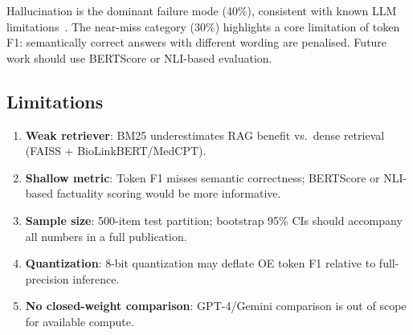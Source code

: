 \documentclass[sigconf, nonacm]{acmart}
\begin{document}
\begin{table}[h]
\caption{Failure case analysis --- 20 lowest OE token-F1 outputs (No RAG, per model)}
\label{tab:failure}
\footnotesize
{}
\end{table}

Hallucination is the dominant failure mode (40\%), consistent with known LLM
limitations~\cite{Ji2023}. The near-miss category (30\%) highlights a core
limitation of token F1: semantically correct answers with different wording
are penalised. Future work should use BERTScore or NLI-based evaluation.

\subsection{Limitations}
\label{sec:limitations}
\begin{enumerate}
  \item \textbf{Weak retriever}: BM25 underestimates RAG benefit vs.\ dense
        retrieval (FAISS + BioLinkBERT/MedCPT).
  \item \textbf{Shallow metric}: Token F1 misses semantic correctness; BERTScore
        or NLI-based factuality scoring would be more informative.
  \item \textbf{Sample size}: 500-item test partition; bootstrap 95\% CIs should
        accompany all numbers in a full publication.
  \item \textbf{Quantization}: 8-bit quantization may deflate OE token F1 relative
        to full-precision inference.
  \item \textbf{No closed-weight comparison}: GPT-4/Gemini comparison is out of
        scope for available compute.
\end{enumerate}
\end{document}
